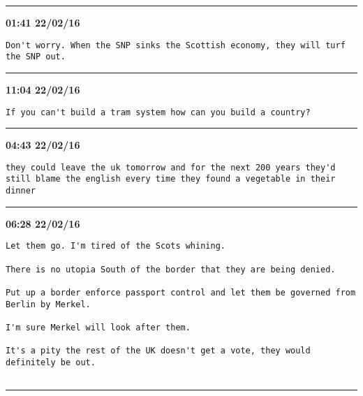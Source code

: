 \hrule%

\begin{adjustwidth}{0cm}{0cm}
\footnotesize \textbf{01:41 22/02/16}

\begin{lstlisting}[breaklines, breakatwhitespace, basicstyle=\small, frame=leftline]
Don't worry. When the SNP sinks the Scottish economy, they will turf the SNP out.
\end{lstlisting}
\end{adjustwidth}

\hrule%

\begin{adjustwidth}{2cm}{0cm}
\footnotesize \textbf{11:04 22/02/16}

\begin{lstlisting}[breaklines, breakatwhitespace, basicstyle=\small, frame=leftline]
If you can't build a tram system how can you build a country?
\end{lstlisting}
\end{adjustwidth}

\hrule%

\begin{adjustwidth}{0cm}{0cm}
\footnotesize \textbf{04:43 22/02/16}

\begin{lstlisting}[breaklines, breakatwhitespace, basicstyle=\small, frame=leftline]
they could leave the uk tomorrow and for the next 200 years they'd still blame the english every time they found a vegetable in their dinner
\end{lstlisting}
\end{adjustwidth}

\hrule%

\begin{adjustwidth}{0cm}{0cm}
\footnotesize \textbf{06:28 22/02/16}

\begin{lstlisting}[breaklines, breakatwhitespace, basicstyle=\small, frame=leftline]
Let them go. I'm tired of the Scots whining.

There is no utopia South of the border that they are being denied.

Put up a border enforce passport control and let them be governed from Berlin by Merkel.

I'm sure Merkel will look after them.

It's a pity the rest of the UK doesn't get a vote, they would definitely be out.


\end{lstlisting}
\end{adjustwidth}

\hrule%

